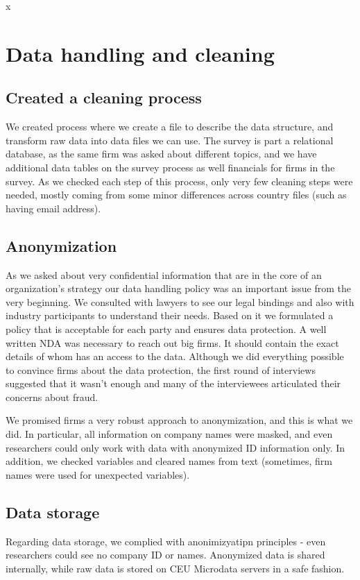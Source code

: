 x\documentclass[final, dvipsnames, authoryear,12pt]{elsarticle}
\begin{document}
\section{Data handling and cleaning}

\subsection{Created a cleaning process}

We created process where we create a file to describe the data structure, and transform raw data into data files we can use. The survey is part a relational database, as the same firm was asked about different topics, and we have additional data tables on the survey process as well financials for firms in the survey. As we checked each step of this process, only very few cleaning steps were needed, mostly coming from some minor differences across country files (such as having email address). 

\subsection{Anonymization} 
As we asked about very confidential information that are in the core of an organization’s strategy our data handling policy was an important issue from the very beginning. We consulted with lawyers to see our legal bindings and also with industry participants to understand their needs. Based on it we formulated a policy that is acceptable for each party and ensures data protection. A well written NDA was necessary to reach out big firms. It should contain the exact details of whom has an access to the data. Although we did everything possible to convince firms about the data protection, the first round of interviews suggested that it wasn’t enough and many of the interviewees articulated their concerns about fraud.

We promised firms a very robust approach to anonymization, and this is what we did. In particular, all information on company names were masked, and even researchers could only work with data with anonymized ID information only. In addition, we checked variables and cleared names from text (sometimes, firm names were used for unexpected variables).

\subsection{Data storage}
Regarding data storage, we complied with anonimizyatipn principles - even researchers could see no company ID or names. Anonymized data is shared internally, while raw data is stored on CEU Microdata servers in a safe fashion. 
\end{document}
